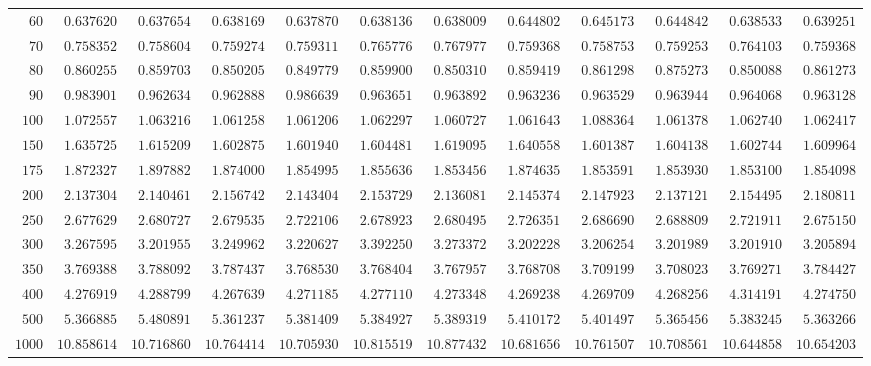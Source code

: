 \begin{sidewaystable}
\begin{tabular}{r|rrrrrrrrrrr}
$60$ & $0.637620$ & $0.637654$ & $0.638169$ & $0.637870$ & $0.638136$ & $0.638009$ & $0.644802$ & $0.645173$ & $0.644842$ & $0.638533$ & $0.639251$ \\
$70$ & $0.758352$ & $0.758604$ & $0.759274$ & $0.759311$ & $0.765776$ & $0.767977$ & $0.759368$ & $0.758753$ & $0.759253$ & $0.764103$ & $0.759368$ \\
$80$ & $0.860255$ & $0.859703$ & $0.850205$ & $0.849779$ & $0.859900$ & $0.850310$ & $0.859419$ & $0.861298$ & $0.875273$ & $0.850088$ & $0.861273$ \\
$90$ & $0.983901$ & $0.962634$ & $0.962888$ & $0.986639$ & $0.963651$ & $0.963892$ & $0.963236$ & $0.963529$ & $0.963944$ & $0.964068$ & $0.963128$ \\
$100$ & $1.072557$ & $1.063216$ & $1.061258$ & $1.061206$ & $1.062297$ & $1.060727$ & $1.061643$ & $1.088364$ & $1.061378$ & $1.062740$ & $1.062417$ \\
$150$ & $1.635725$ & $1.615209$ & $1.602875$ & $1.601940$ & $1.604481$ & $1.619095$ & $1.640558$ & $1.601387$ & $1.604138$ & $1.602744$ & $1.609964$ \\
$175$ & $1.872327$ & $1.897882$ & $1.874000$ & $1.854995$ & $1.855636$ & $1.853456$ & $1.874635$ & $1.853591$ & $1.853930$ & $1.853100$ & $1.854098$ \\
$200$ & $2.137304$ & $2.140461$ & $2.156742$ & $2.143404$ & $2.153729$ & $2.136081$ & $2.145374$ & $2.147923$ & $2.137121$ & $2.154495$ & $2.180811$ \\
$250$ & $2.677629$ & $2.680727$ & $2.679535$ & $2.722106$ & $2.678923$ & $2.680495$ & $2.726351$ & $2.686690$ & $2.688809$ & $2.721911$ & $2.675150$ \\
$300$ & $3.267595$ & $3.201955$ & $3.249962$ & $3.220627$ & $3.392250$ & $3.273372$ & $3.202228$ & $3.206254$ & $3.201989$ & $3.201910$ & $3.205894$ \\
$350$ & $3.769388$ & $3.788092$ & $3.787437$ & $3.768530$ & $3.768404$ & $3.767957$ & $3.768708$ & $3.709199$ & $3.708023$ & $3.769271$ & $3.784427$ \\
$400$ & $4.276919$ & $4.288799$ & $4.267639$ & $4.271185$ & $4.277110$ & $4.273348$ & $4.269238$ & $4.269709$ & $4.268256$ & $4.314191$ & $4.274750$ \\
$500$ & $5.366885$ & $5.480891$ & $5.361237$ & $5.381409$ & $5.384927$ & $5.389319$ & $5.410172$ & $5.401497$ & $5.365456$ & $5.383245$ & $5.363266$ \\
$1000$ & $10.858614$ & $10.716860$ & $10.764414$ & $10.705930$ & $10.815519$ & $10.877432$ & $10.681656$ & $10.761507$ & $10.708561$ & $10.644858$ & $10.654203$ \\
\hline
\end{tabular}
\end{sidewaystable}
 
